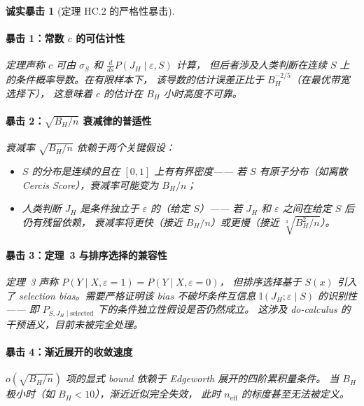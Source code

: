\documentclass[12pt,a4paper]{article}
\newtheorem{critique}[theorem]{诚实暴击}
\newcommand{\I}{\mathbb{I}}
\begin{document}
\begin{critique}[定理 HC.2 的严格性暴击]

\paragraph{暴击 1：常数 $c$ 的可估计性}
定理声称 $c$ 可由 $\sigma_S$ 和 $\frac{d}{ds} P(J_H \mid \varepsilon, S)$ 计算，
但后者涉及人类判断在连续 $S$ 上的条件概率导数。在有限样本下，
该导数的估计误差正比于 $B_H^{-2/5}$（在最优带宽选择下），
这意味着 $c$ 的估计在 $B_H$ 小时高度不可靠。

\paragraph{暴击 2：$\sqrt{B_H/n}$ 衰减律的普适性}
衰减率 $\sqrt{B_H/n}$ 依赖于两个关键假设：
\begin{itemize}
    \item $S$ 的分布是连续的且在 $[0,1]$ 上有有界密度——
          若 $S$ 有原子分布（如离散 Cercis Score），衰减率可能变为 $B_H/n$；
    \item 人类判断 $J_H$ 是条件独立于 $\varepsilon$ 的（给定 $S$）——
          若 $J_H$ 和 $\varepsilon$ 之间在给定 $S$ 后仍有残留依赖，
          衰减率将更快（接近 $B_H/n$）或更慢（接近 $\sqrt[3]{B_H^2/n}$）。
\end{itemize}

\paragraph{暴击 3：定理~3 与排序选择的兼容性}
定理~3 声称 $P(Y \mid X, \varepsilon=1) = P(Y \mid X, \varepsilon=0)$，
但排序选择基于 $S(x)$ 引入了 selection bias。需要严格证明该 bias
不破坏条件互信息 $\I(J_H; \varepsilon \mid S)$ 的识别性——
即 $P_{S,J_H \mid \text{selected}}$ 下的条件独立性假设是否仍然成立。
这涉及 do-calculus 的干预语义，目前未被完全处理。

\paragraph{暴击 4：渐近展开的收敛速度}
$o(\sqrt{B_H/n})$ 项的显式 bound 依赖于 Edgeworth 展开的四阶累积量条件。
当 $B_H$ 极小时（如 $B_H < 10$），渐近近似完全失效，
此时 $n_{\mathrm{eff}}$ 的标度甚至无法被定义。

\end{critique}

\end{document}
